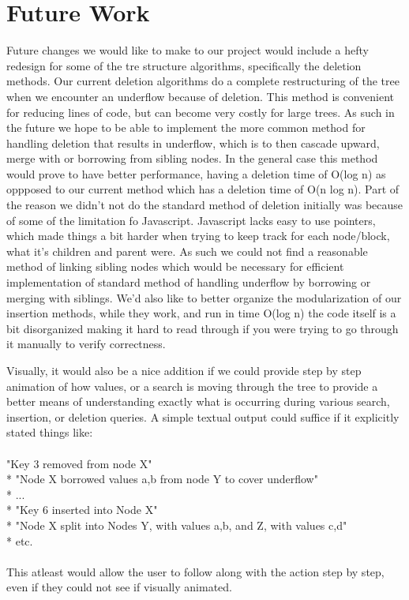 \section{Future Work}

Future changes we would like to make to our project would include a
hefty redesign for some of the tre structure algorithms, specifically
the deletion methods.  Our current deletion algorithms do a complete
restructuring of the tree when we encounter an underflow because of
deletion.  This method is convenient for reducing lines of code, but
can become very costly for large trees.  As such in the future we hope
to be able to implement the more common method for handling deletion
that results in underflow, which is to then cascade upward, merge with
or borrowing from sibling nodes.  In the general case this method
would prove to have better performance, having a deletion time of
O(log n) as oppposed to our current method which has a deletion time
of O(n log n).  Part of the reason we didn't not do the standard
method of deletion initially was because of some of the limitation fo
Javascript.  Javascript lacks easy to use pointers, which made things
a bit harder when trying to keep track for each node/block, what it's
children and parent were.  As such we could not find a reasonable
method of linking sibling nodes which would be necessary for efficient
implementation of standard method of handling underflow by borrowing
or merging with siblings.  We'd also like to better organize the
modularization of our insertion methods, while they work, and run in
time O(log n) the code itself is a bit disorganized making it hard to
read through if you were trying to go through it manually to verify
correctness.

Visually, it would also be a nice addition if we could provide step by
step animation of how values, or a search is moving through the tree
to provide a better means of understanding exactly what is occurring
during various search, insertion, or deletion queries.  A simple
textual output could suffice if it explicitly stated things like:
\\ \\
"Key 3 removed from node X"
\\*
"Node X borrowed values a,b from node Y to cover underflow"
\\*
...
\\*
"Key 6 inserted into Node X"
\\*
"Node X split into Nodes Y, with values a,b, and Z, with values c,d"
\\*
etc.
\\ \\
This atleast would allow the user to follow along with the action step
by step, even if they could not see if visually animated.


